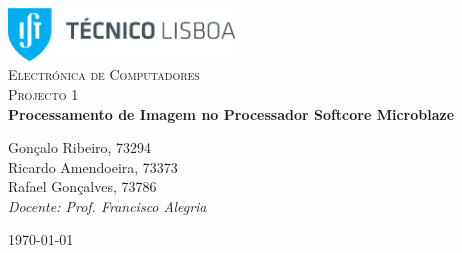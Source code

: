 \begin{titlepage}

	\begin{center}

		\includegraphics[width=6cm]{./title}\\[3cm]

		\textsc{\LARGE Electrónica de Computadores}\\[1.5cm]

		\textsc{\Large Projecto 1}\\[1.5cm]


		{ \huge \bfseries Processamento de Imagem no Processador Softcore Microblaze\texttrademark\\[2.5cm] }


		\noindent
		\begin{center} \large
			Gonçalo Ribeiro, 73294\\[5mm]

			Ricardo Amendoeira, 73373\\[5mm]

			Rafael Gonçalves, 73786\\[2.5cm]

			\textit{Docente: Prof. Francisco Alegria}

		\end{center}

		\vfill

		{\large \today}

	\end{center}

\end{titlepage}